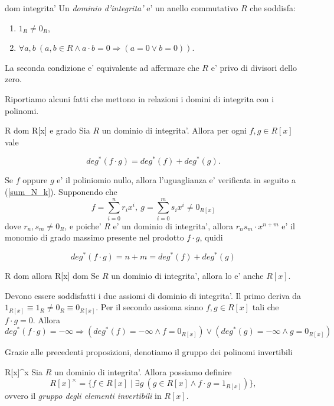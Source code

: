 \begin{defn}{dom integrita'}
Un \emph{dominio d'integrita'} e' un anello commutativo $R$ che soddisfa:
\begin{enumerate}
  \item $1_R \neq 0_R$,
  \item $\forall a,b\ (a, b \in R \land a\cdot b = 0 \Rightarrow (a=0 \lor b=0))$.
\end{enumerate}
La seconda condizione e' equivalente ad affermare che $R$ e' privo di divisori dello zero.
\end{defn}
Riportiamo alcuni fatti che mettono in relazioni i domini di integrita con i polinomi.

\begin{prop}[]{R dom R[x] e grado}
Sia $R$ un dominio di integrita'. Allora per ogni $f,g \in R[x]$ vale

\begin{equation}
deg^*(f\cdot g) = deg^*(f) + deg^*(g).
\end{equation}

\end{prop}
\begin{dimostrazione}
Se $f$ oppure $g$ e' il poliniomio nullo, allora l'uguaglianza e' verificata in seguito a (\ref{sum_N_k}). 
Supponendo che
\[f = \sum_{i=0}^{n}r_ix^i,\ g = \sum_{i=0}^{m}s_ix^i \neq 0_{R[x]}\]
dove $r_n,s_m \neq 0_R$, e poiche' $R$ e' un dominio di integrita', allora
$r_ns_m \cdot x^{n+m}$ e' il monomio di grado massimo presente nel prodotto $f\cdot g$, quidi

\[deg^*(f \cdot g) = n + m = deg^*(f) + deg^*(g)\]
\end{dimostrazione}

\begin{prop}[]{R dom allora R[x] dom}
Se $R$ un dominio di integrita', allora lo e' anche $R[x]$.
\end{prop}
\begin{dimostrazione}
Devono essere soddisfatti i due assiomi di dominio di integrita'.
Il primo deriva da $1_{R[x]} \equiv 1_R \neq 0_R \equiv 0_{R[x]}$.
Per il secondo assioma siano $f,g \in R[x]$ tali che $f\cdot g = 0$. Allora 
\[deg^*(f\cdot g) = -\infty \Longrightarrow (deg^*(f) = -\infty \land f=0_{R[x]}) \lor (deg^*(g) = -\infty \land g=0_{R[x]}) \]
\end{dimostrazione}
Grazie alle precedenti proposizioni, denotiamo il gruppo dei polinomi invertibili

\begin{defn}{R[x]^x}
Sia $R$ un dominio di integrita'. Allora possiamo definire
\[R[x]^{\times} = \{ f \in R[x] \mid \exists g\ (g\in R[x] \land f\cdot g = 1_{R[x]}) \} ,\]
ovvero il \emph{gruppo degli elementi invertibili} in $R[x]$.
\end{defn}


